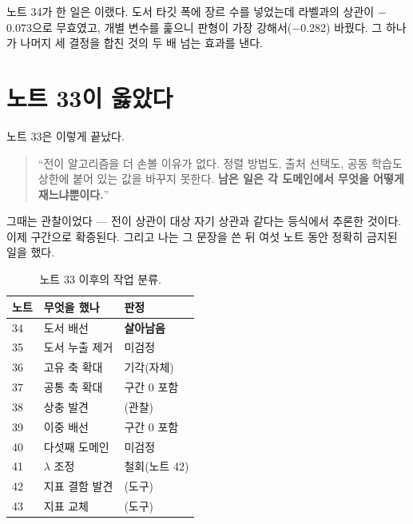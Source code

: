 \documentclass[10pt]{article}
\begin{document}

노트 34가 한 일은 이랬다. 도서 타깃 폭에 장르 수를 넣었는데 라벨과의 상관이
$-$0.073으로 무효였고, 개별 변수를 훑으니 판형이 가장 강해서($-$0.282) 바꿨다.
그 하나가 나머지 세 결정을 합친 것의 두 배 넘는 효과를 낸다.

\section{노트 33이 옳았다}

노트 33은 이렇게 끝났다.

\begin{quote}\fontsize{9.5}{11.5}\selectfont
``전이 알고리즘을 더 손볼 이유가 없다. 정렬 방법도, 출처 선택도, 공동 학습도
상한에 붙어 있는 값을 바꾸지 못한다. \textbf{남은 일은 각 도메인에서 무엇을
어떻게 재느냐뿐이다.}''
\end{quote}

그때는 관찰이었다 --- 전이 상관이 대상 자기 상관과 같다는 등식에서 추론한 것이다.
이제 구간으로 확증된다. 그리고 나는 그 문장을 쓴 뒤 여섯 노트 동안 정확히
금지된 일을 했다.

\begin{table}[t]
\centering\tsize
\caption{노트 33 이후의 작업 분류.}
\begin{tabular}{lll}
\toprule
노트 & 무엇을 했나 & 판정 \\
\midrule
34 & 도서 배선 & \textbf{살아남음} \\
35 & 도서 누출 제거 & 미검정 \\
36 & 고유 축 확대 & 기각(자체) \\
37 & 공통 축 확대 & 구간 0 포함 \\
38 & 상충 발견 & (관찰) \\
39 & 이중 배선 & 구간 0 포함 \\
40 & 다섯째 도메인 & 미검정 \\
41 & $\lambda$ 조정 & 철회(노트 42) \\
42 & 지표 결함 발견 & (도구) \\
43 & 지표 교체 & (도구) \\
\bottomrule
\end{tabular}
\end{table}
\end{document}
